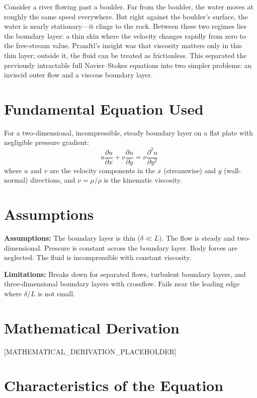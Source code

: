 \documentclass[11pt,openright]{book}
\begin{document}
Consider a river flowing past a boulder. Far from the boulder, the water moves at roughly the same speed everywhere. But right against the boulder's surface, the water is nearly stationary---it clings to the rock. Between these two regimes lies the boundary layer: a thin skin where the velocity changes rapidly from zero to the free-stream value. Prandtl's insight was that viscosity matters only in this thin layer; outside it, the fluid can be treated as frictionless. This separated the previously intractable full Navier--Stokes equations into two simpler problems: an inviscid outer flow and a viscous boundary layer.
\section*{Fundamental Equation Used}

For a two-dimensional, incompressible, steady boundary layer on a flat plate with negligible pressure gradient:
\[
u\frac{\partial u}{\partial x} + v\frac{\partial u}{\partial y} = \nu \frac{\partial^2 u}{\partial y^2}
\]
where $u$ and $v$ are the velocity components in the $x$ (streamwise) and $y$ (wall-normal) directions, and $\nu = \mu/\rho$ is the kinematic viscosity.
\section*{Assumptions}

\textbf{Assumptions:} The boundary layer is thin ($\delta \ll L$). The flow is steady and two-dimensional. Pressure is constant across the boundary layer. Body forces are neglected. The fluid is incompressible with constant viscosity.


\textbf{Limitations:} Breaks down for separated flows, turbulent boundary layers, and three-dimensional boundary layers with crossflow. Fails near the leading edge where $\delta/L$ is not small.


\section*{Mathematical Derivation}

[MATHEMATICAL_DERIVATION_PLACEHOLDER]

\section*{Characteristics of the Equation}
\end{document}
